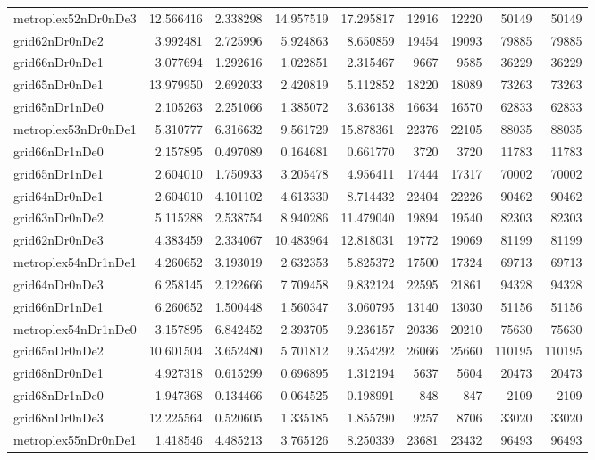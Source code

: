 \begin{longtable}{|l|r|r|r|r|r|r|r|r|}
metroplex52nDr0nDe3 & 12.566416 & 2.338298 & 14.957519 & 17.295817 & 12916 & 12220 & 50149 & 50149 \\
grid62nDr0nDe2 & 3.992481 & 2.725996 & 5.924863 & 8.650859 & 19454 & 19093 & 79885 & 79885 \\
grid66nDr0nDe1 & 3.077694 & 1.292616 & 1.022851 & 2.315467 & 9667 & 9585 & 36229 & 36229 \\
grid65nDr0nDe1 & 13.979950 & 2.692033 & 2.420819 & 5.112852 & 18220 & 18089 & 73263 & 73263 \\
grid65nDr1nDe0 & 2.105263 & 2.251066 & 1.385072 & 3.636138 & 16634 & 16570 & 62833 & 62833 \\
metroplex53nDr0nDe1 & 5.310777 & 6.316632 & 9.561729 & 15.878361 & 22376 & 22105 & 88035 & 88035 \\
grid66nDr1nDe0 & 2.157895 & 0.497089 & 0.164681 & 0.661770 & 3720 & 3720 & 11783 & 11783 \\
grid65nDr1nDe1 & 2.604010 & 1.750933 & 3.205478 & 4.956411 & 17444 & 17317 & 70002 & 70002 \\
grid64nDr0nDe1 & 2.604010 & 4.101102 & 4.613330 & 8.714432 & 22404 & 22226 & 90462 & 90462 \\
grid63nDr0nDe2 & 5.115288 & 2.538754 & 8.940286 & 11.479040 & 19894 & 19540 & 82303 & 82303 \\
grid62nDr0nDe3 & 4.383459 & 2.334067 & 10.483964 & 12.818031 & 19772 & 19069 & 81199 & 81199 \\
metroplex54nDr1nDe1 & 4.260652 & 3.193019 & 2.632353 & 5.825372 & 17500 & 17324 & 69713 & 69713 \\
grid64nDr0nDe3 & 6.258145 & 2.122666 & 7.709458 & 9.832124 & 22595 & 21861 & 94328 & 94328 \\
grid66nDr1nDe1 & 6.260652 & 1.500448 & 1.560347 & 3.060795 & 13140 & 13030 & 51156 & 51156 \\
metroplex54nDr1nDe0 & 3.157895 & 6.842452 & 2.393705 & 9.236157 & 20336 & 20210 & 75630 & 75630 \\
grid65nDr0nDe2 & 10.601504 & 3.652480 & 5.701812 & 9.354292 & 26066 & 25660 & 110195 & 110195 \\
grid68nDr0nDe1 & 4.927318 & 0.615299 & 0.696895 & 1.312194 & 5637 & 5604 & 20473 & 20473 \\
grid68nDr1nDe0 & 1.947368 & 0.134466 & 0.064525 & 0.198991 & 848 & 847 & 2109 & 2109 \\
grid68nDr0nDe3 & 12.225564 & 0.520605 & 1.335185 & 1.855790 & 9257 & 8706 & 33020 & 33020 \\
metroplex55nDr0nDe1 & 1.418546 & 4.485213 & 3.765126 & 8.250339 & 23681 & 23432 & 96493 & 96493 \\

\end{longtable}
